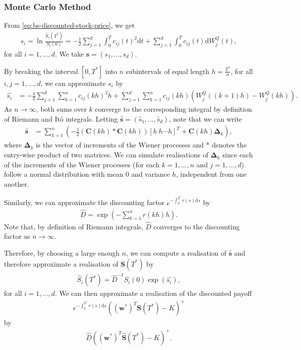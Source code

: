 \documentclass[english]{article}
\numberwithin{equation}{section}
\numberwithin{figure}{section}
\theoremstyle{bolddescit}
\theoremstyle{definition}
\theoremstyle{definition}
\theoremstyle{plain}
\theoremstyle{plain}
\theoremstyle{bolddesc}
\theoremstyle{plain}
\theoremstyle{remark}
\begin{document}
\subsubsection{Monte Carlo Method}\label{sec:monte-carlo}

From \eqref{eq:bs-discounted-stock-price}, we get
\begin{align*}
  s_i = \ln \frac{\widetilde{S_i}(T^*)}{S_i(0)} = - \frac{1}{2} \sum_{j=1}^{d} \int_0^T c_{ij}(t)^2 \mathrm{d}t + \sum_{j=1}^{d} \int_0^T c_{ij}(t) \mathrm{d}W^Q_j(t),
\end{align*}
for all $i=1,\ldots,d$. We take $\mathbf{s} = (s_1,\ldots,s_d)$.

By breaking the interval $[0,T^*]$ into $n$ subintervals of equal length $h = \frac{T^*}{n}$, for all $i,j=1,\ldots,d$, we can approximate $s_i$ by
\begin{align*}
  \hat{s_i} &= - \frac{1}{2} \sum_{j=1}^{d} \sum_{k=1}^{n} c_{ij}(kh)^2 h + \sum_{j=1}^{d} \sum_{k=1}^{n}  c_{ij}(kh) (W^Q_j((k+1)h) - W^Q_j(kh)).
\end{align*}
As $n \to \infty$, both sums over $k$ converge to the corresponding integral by definition of Riemann and It\^o integrals. Letting $\hat{\mathbf{s}} = (\hat{s}_1,\ldots,\hat{s}_d)$, note that we can write
\begin{align*}
  \hat{\mathbf{s}} &= \sum_{k=1}^{n} \left( - \frac{1}{2} (\mathbf{C}(kh) * \mathbf{C}(kh)) [h\ h \cdots h]^T + \mathbf{C}(kh) \mathbf{\Delta}_k \right),
\end{align*}
where $\mathbf{\Delta}_k$ is the vector of increments of the Wiener processes and $*$ denotes the entry-wise product of two matrices. We can simulate realisations of $\mathbf{\Delta}_k$ since each of the increments of the Wiener processes (for each $k=1,\ldots,n$ and $j=1,\ldots,d$) follow a normal distribution with mean 0 and variance $h$, independent from one another.

Similarly, we can approximate the discounting factor $e^{-\int_0^{T^*} r(s) \mathrm{d}s}$ by
\begin{align*}
  \hat{D} = \exp \left(-\sum_{k=1}^{n} r(kh) h\right).
\end{align*}
Note that, by definition of Riemann integrals, $\hat{D}$ converges to the discounting factor as $n \to \infty$.

Therefore, by choosing a large enough $n$, we can compute a realisation of $\hat{\mathbf{s}}$ and therefore approximate a realisation of $\mathbf{S}(T^*)$ by
\begin{align*}
  \hat{S}_i(T^*) = \hat{D}^{-1} S_i(0) \exp\left(\hat{s_i}\right),
\end{align*}
for all $i=1,\ldots,d$. We can then approximate a realisation of the discounted payoff
\begin{align}\label{eq:monte-carlo-discounted-payoff}
  e^{-\int_0^{T^*} r(s) \mathrm{d}s} ((\mathbf{w}^*)^T \mathbf{S}(T^*) - K)^+
\end{align}
by
\begin{align*}
  \hat{D} ((\mathbf{w}^*)^T \hat{\mathbf{S}}(T^*) - K)^+.
\end{align*}
\end{document}
